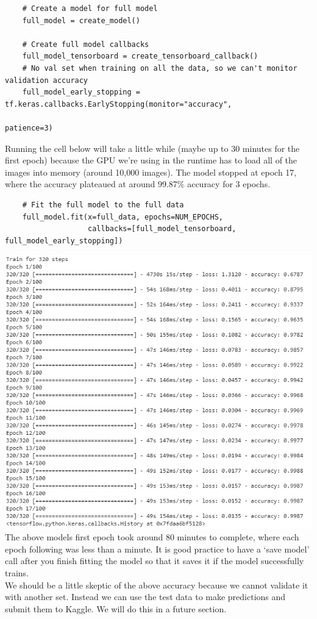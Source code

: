 \documentclass[11pt, a4paper]{article}
\begin{document}
\begin{spacing}{1.1}
	\begin{lstlisting}
	# Create a model for full model
	full_model = create_model()
	
	# Create full model callbacks
	full_model_tensorboard = create_tensorboard_callback()
	# No val set when training on all the data, so we can't monitor validation accuracy
	full_model_early_stopping = tf.keras.callbacks.EarlyStopping(monitor="accuracy",
	                                                             patience=3) \end{lstlisting} \vspace*{1mm}
	Running the cell below will take a little while (maybe up to 30 minutes for the first epoch) because the GPU we're using in the runtime has to load all of the images into memory (around 10,000 images). The model stopped at epoch 17, where the accuracy plateaued at around 99.87\% accuracy for 3 epochs.
	\begin{lstlisting}
	# Fit the full model to the full data
	full_model.fit(x=full_data,	epochs=NUM_EPOCHS,
	               callbacks=[full_model_tensorboard, full_model_early_stopping]) \end{lstlisting} \vspace*{1mm}
	\includegraphics[scale=1]{full_model} \vspace*{2mm} \\
	The above models first epoch took around 80 minutes to complete, where each epoch following was less than a minute. It is good practice to have a `save model' call after you finish fitting the model so that it saves it if the model successfully trains. \vspace*{1mm} \\
	We should be a little skeptic of the above accuracy because we cannot validate it with another set. Instead we can use the test data to make predictions and submit them to Kaggle. We will do this in a future section. \newpage


\end{spacing}
\end{document}
